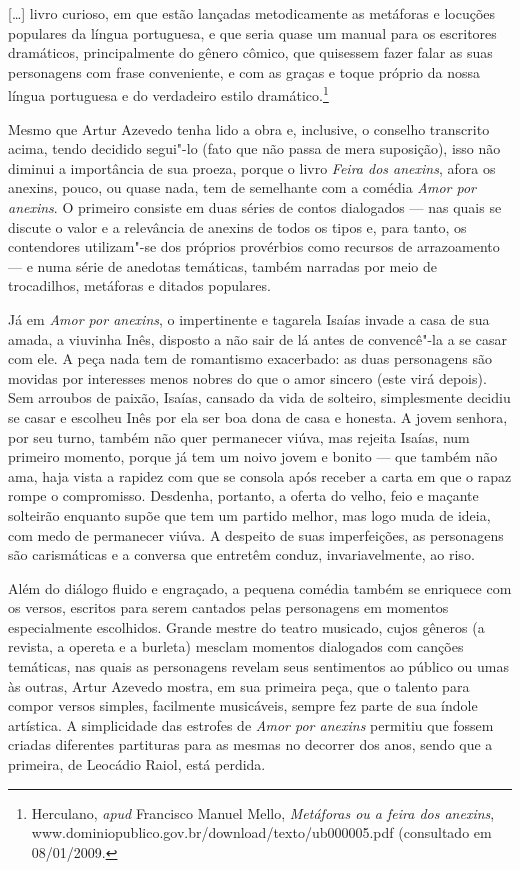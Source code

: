 \begin{hedraquote} 
\mbox{}[\ldots{}] livro curioso, em que estão lançadas metodicamente as metáforas e
locuções populares da língua portuguesa, e que seria quase um manual
para os escritores dramáticos, principalmente do gênero cômico, que
quisessem fazer falar as suas personagens com frase conveniente, e com
as graças e toque próprio da nossa língua portuguesa e do verdadeiro
estilo dramático.\footnote{ Herculano, \textit{apud }Francisco
Manuel Mello, \textit{Metáforas ou a feira dos anexins}, www.dominiopublico.gov.br/download/texto/ub000005.pdf
(consultado em 08/01/2009.}
\end{hedraquote} 

Mesmo que Artur Azevedo tenha lido a obra e, inclusive, o conselho
transcrito acima, tendo decidido segui"-lo (fato que não passa de mera suposição), isso não diminui a importância de sua proeza, porque o
livro \textit{Feira dos anexins}, afora os anexins, pouco, ou quase
nada, tem de semelhante com a comédia \textit{Amor por anexins}. O
primeiro consiste em duas séries de contos dialogados --- nas quais
se discute o valor e a relevância de anexins de todos os tipos e, para
tanto, os contendores utilizam"-se dos próprios provérbios como recursos
de arrazoamento --- e numa série de anedotas temáticas, também
narradas por meio de trocadilhos, metáforas e ditados populares. 

Já em \textit{Amor por anexins}, o impertinente e tagarela
Isaías invade a casa de sua amada, a viuvinha Inês, disposto a não sair
de lá antes de convencê"-la a se casar com ele. A peça nada tem de
romantismo exacerbado: as duas personagens são movidas por interesses
menos nobres do que o amor sincero (este virá depois). Sem arroubos de
paixão, Isaías, cansado da vida de solteiro, simplesmente decidiu se
casar e escolheu Inês por ela ser boa dona de casa e honesta. A jovem
senhora, por seu turno, também não quer permanecer viúva, mas rejeita
Isaías, num primeiro momento, porque já tem um noivo jovem e bonito ---
que também não ama, haja vista a rapidez com que se consola após
receber a carta em que o rapaz rompe o compromisso.  Desdenha,
portanto, a oferta do velho, feio e maçante solteirão enquanto supõe
que tem um partido melhor, mas logo muda de ideia, com medo de
permanecer viúva. A despeito de suas imperfeições, as personagens são
carismáticas e a conversa que entretêm conduz, invariavelmente, ao
riso. 

Além do diálogo fluido e engraçado, a pequena comédia também se
enriquece com os versos, escritos para serem cantados pelas personagens
em momentos especialmente escolhidos. Grande mestre do teatro musicado,
cujos gêneros (a revista, a opereta e a burleta) mesclam momentos
dialogados com canções temáticas, nas quais as personagens revelam seus
sentimentos ao público ou umas às outras, Artur Azevedo mostra, em sua
primeira peça, que o talento para compor versos simples, facilmente
musicáveis, sempre fez parte de sua índole artística. A simplicidade
das estrofes de \textit{Amor por anexins} permitiu que fossem criadas
diferentes partituras para as mesmas no decorrer dos anos, sendo que a
primeira, de Leocádio Raiol, está perdida. 

